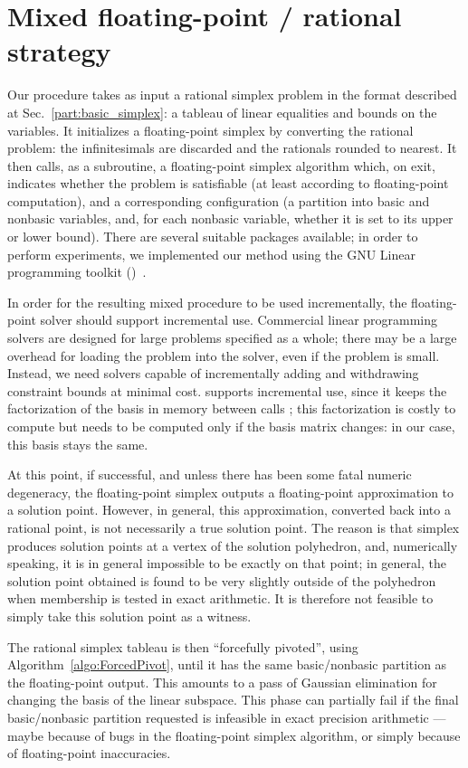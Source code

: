 \section{Mixed floating-point / rational strategy}
\label{part:mixed}
Our procedure takes as input a rational simplex problem in the format described at Sec.~\ref{part:basic_simplex}: a tableau of linear equalities and bounds on the variables. It initializes a floating-point simplex by converting the rational problem: the infinitesimals are discarded and the rationals rounded to nearest. It then calls, as a subroutine, a floating-point simplex algorithm which, on exit, indicates whether the problem is satisfiable (at least according to floating-point computation), and a corresponding configuration (a partition into basic and nonbasic variables, and, for each nonbasic variable, whether it is set to its upper or lower bound). There are several suitable packages available; in order to perform experiments, we implemented our method using the GNU Linear programming toolkit ()~\cite{GLPK}.

In order for the resulting mixed procedure to be used incrementally, the floating-point solver should support incremental use. Commercial linear programming solvers are designed for large problems specified as a whole; there may be a large overhead for loading the problem into the solver, even if the problem is small. Instead, we need solvers capable of incrementally adding and withdrawing constraint bounds at minimal cost.  supports incremental use, since it keeps the factorization of the basis in memory between calls \cite[p.~20]{GLPK}; this factorization is costly to compute but needs to be computed only if the basis matrix changes: in our case, this basis stays the same.

At this point, if successful, and unless there has been some fatal numeric degeneracy, the floating-point simplex outputs a floating-point approximation to a solution point. However, in general, this approximation, converted back into a rational point, is not necessarily a true solution point. The reason is that simplex produces solution points at a vertex of the solution polyhedron, and, numerically speaking, it is in general impossible to be exactly on that point; in general, the solution point obtained is found to be very slightly outside of the polyhedron when membership is tested in exact arithmetic. It is therefore not feasible to simply take this solution point as a witness.

The rational simplex tableau is then ``forcefully pivoted'', using Algorithm~\ref{algo:ForcedPivot}, until it has the same basic/nonbasic partition as the floating-point output. This amounts to a pass of Gaussian elimination for changing the basis of the linear subspace. This phase can partially fail if the final basic/nonbasic partition requested is infeasible in exact precision arithmetic --- maybe because of bugs in the floating-point simplex algorithm, or simply because of floating-point inaccuracies.


